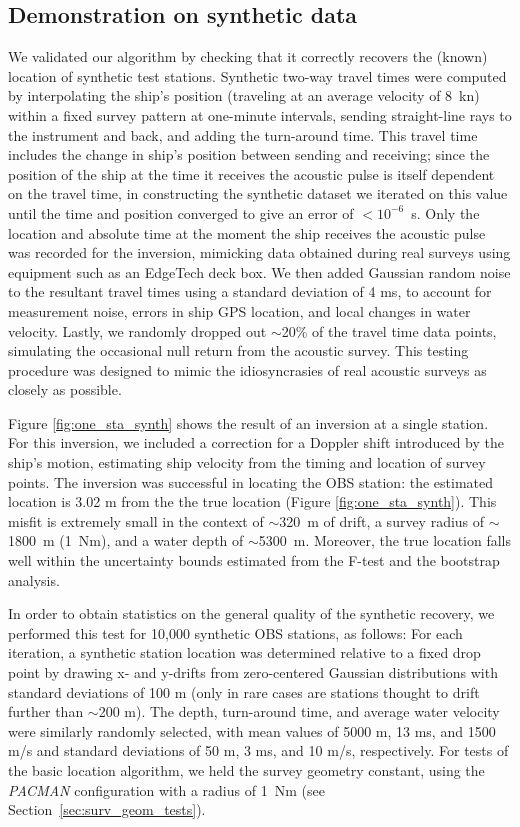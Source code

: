 
\subsection{Demonstration on synthetic data} \label{Demonstration on synthetic data}
We validated our algorithm by checking that it correctly recovers the (known) location of synthetic test stations. Synthetic two-way travel times were computed by interpolating the ship's position (traveling at an average velocity of 8~kn) within a fixed survey pattern at one-minute intervals, sending straight-line rays to the instrument and back, and adding the turn-around time. This travel time includes the change in ship's position between sending and receiving; since the position of the ship at the time it receives the acoustic pulse is itself dependent on the travel time, in constructing the synthetic dataset we iterated on this value until the time and position converged to give an error of \mbox{$<10^{-6}$ s}. Only the location and absolute time at the moment the ship receives the acoustic pulse was recorded for the inversion, mimicking data obtained during real surveys using equipment such as an EdgeTech deck box. We then added Gaussian random noise to the resultant travel times using a standard deviation of 4 ms, to account for measurement noise, errors in ship GPS location, and local changes in water velocity. Lastly, we randomly dropped out $\sim$20\% of the travel time data points, simulating the occasional null return from the acoustic survey. This testing procedure was designed to mimic the idiosyncrasies of real acoustic surveys as closely as possible. 

Figure \ref{fig:one_sta_synth} shows the result of an inversion at a single station. For this inversion, we included a correction for a Doppler shift introduced by the ship's motion, estimating ship velocity from the timing and location of survey points. The inversion was successful in locating the OBS station: the estimated location is 3.02 m from the the true location (Figure \ref{fig:one_sta_synth}). This misfit is extremely small in the context of $\sim$320~m of drift, a survey radius of $\sim$1800~m (1~Nm), and a water depth of $\sim$5300~m. Moreover, the true location falls well within the uncertainty bounds estimated from the F-test and the bootstrap analysis. 

In order to obtain statistics on the general quality of the synthetic recovery, we performed this test for 10,000 synthetic OBS stations, as follows: For each iteration, a synthetic station location was determined relative to a fixed drop point by drawing x- and y-drifts from zero-centered Gaussian distributions with standard deviations of 100 m (only in rare cases are stations thought to drift further than $\sim$200 m). The depth, turn-around time, and average water velocity were similarly randomly selected, with mean values of 5000 m, 13 ms, and 1500 m/s and standard deviations of 50 m, 3 ms, and 10 m/s, respectively. For tests of the basic location algorithm, we held the survey geometry constant, using the \textit{PACMAN} configuration with a radius of 1~Nm (see Section~\ref{sec:surv_geom_tests}). 
  
